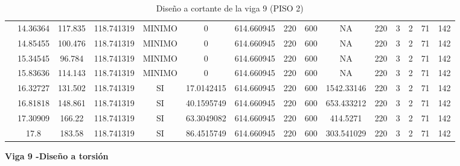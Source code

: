 \begin{table}[H]
{\begin{tabular}{|c|c|c|c|c|c|c|c|c|c|c|c|c|c|c|}
\cline{2-15}    & 14.36364 & 117.835 & 118.741319 & MINIMO & 0   & 614.660945 & 220 & 600 & NA  & 220 & 3   & 2   & 71  & 142 \bigstrut\\
\cline{2-15}    & 14.85455 & 100.476 & 118.741319 & MINIMO & 0   & 614.660945 & 220 & 600 & NA  & 220 & 3   & 2   & 71  & 142 \bigstrut\\
\cline{2-15}    & 15.34545 & 96.784 & 118.741319 & MINIMO & 0   & 614.660945 & 220 & 600 & NA  & 220 & 3   & 2   & 71  & 142 \bigstrut\\
\cline{2-15}    & 15.83636 & 114.143 & 118.741319 & MINIMO & 0   & 614.660945 & 220 & 600 & NA  & 220 & 3   & 2   & 71  & 142 \bigstrut\\
\cline{2-15}    & 16.32727 & 131.502 & 118.741319 & SI  & 17.0142415 & 614.660945 & 220 & 600 & 1542.33146 & 220 & 3   & 2   & 71  & 142 \bigstrut\\
\cline{2-15}    & 16.81818 & 148.861 & 118.741319 & SI  & 40.1595749 & 614.660945 & 220 & 600 & 653.433212 & 220 & 3   & 2   & 71  & 142 \bigstrut\\
\cline{2-15}    & 17.30909 & 166.22 & 118.741319 & SI  & 63.3049082 & 614.660945 & 220 & 600 & 414.5271 & 220 & 3   & 2   & 71  & 142 \bigstrut\\
\cline{2-15}    & 17.8 & 183.58 & 118.741319 & SI  & 86.4515749 & 614.660945 & 220 & 600 & 303.541029 & 220 & 3   & 2   & 71  & 142 \bigstrut\\
\hline
\end{tabular}%



  }%
    \caption{Diseño a cortante de la viga 9 (PISO 2) }
  \label{tab:C VG9 P2 }%
\end{table}%
\newpage
\textbf{Viga 9 -Diseño a torsión}
